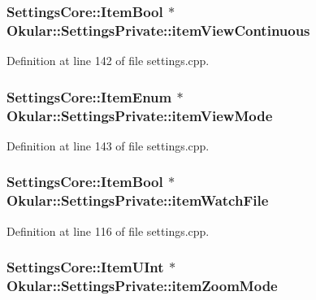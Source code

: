 \hypertarget{classOkular_1_1SettingsPrivate_a819238b76819053c13a29191b8766e21}{
\subsubsection[{item\+View\+Continuous}]{\setlength{\rightskip}{0pt plus 5cm}Settings\+Core\+::\+Item\+Bool $\ast$ Okular\+::\+Settings\+Private\+::item\+View\+Continuous}}\label{classOkular_1_1SettingsPrivate_a819238b76819053c13a29191b8766e21}


Definition at line 142 of file settings.\+cpp.

\hypertarget{classOkular_1_1SettingsPrivate_a8a95244330e62699e739be887460a2ba}{
\subsubsection[{item\+View\+Mode}]{\setlength{\rightskip}{0pt plus 5cm}Settings\+Core\+::\+Item\+Enum $\ast$ Okular\+::\+Settings\+Private\+::item\+View\+Mode}}\label{classOkular_1_1SettingsPrivate_a8a95244330e62699e739be887460a2ba}


Definition at line 143 of file settings.\+cpp.

\hypertarget{classOkular_1_1SettingsPrivate_a3af381a9ba48af46f9038813673f0a12}{
\subsubsection[{item\+Watch\+File}]{\setlength{\rightskip}{0pt plus 5cm}Settings\+Core\+::\+Item\+Bool $\ast$ Okular\+::\+Settings\+Private\+::item\+Watch\+File}}\label{classOkular_1_1SettingsPrivate_a3af381a9ba48af46f9038813673f0a12}


Definition at line 116 of file settings.\+cpp.

\hypertarget{classOkular_1_1SettingsPrivate_a63b3fe05c0719de0f94cfbab41d4f52e}{
\subsubsection[{item\+Zoom\+Mode}]{\setlength{\rightskip}{0pt plus 5cm}Settings\+Core\+::\+Item\+U\+Int $\ast$ Okular\+::\+Settings\+Private\+::item\+Zoom\+Mode}}\label{classOkular_1_1SettingsPrivate_a63b3fe05c0719de0f94cfbab41d4f52e}


